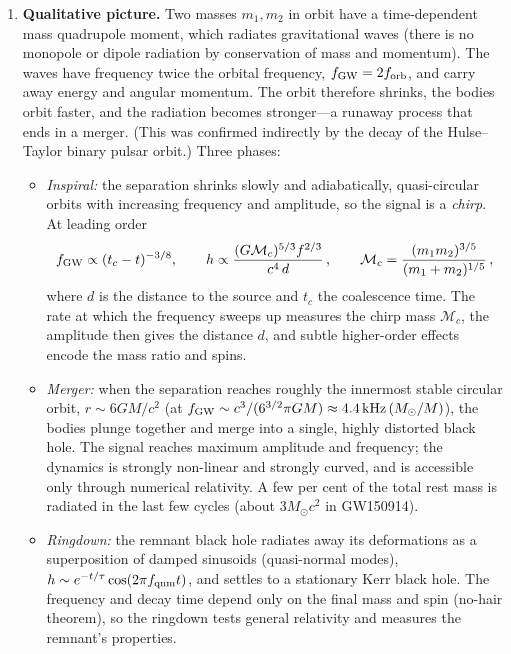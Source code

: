 \documentclass[12pt]{article}
\newcommand{\be}{\begin{equation}}
\newcommand{\ee}{\end{equation}}
\begin{document}
\begin{enumerate}[label=\alph*)]
\item \textbf{Qualitative picture.} Two masses $m_1,m_2$ in orbit have a time-dependent mass quadrupole moment, which radiates gravitational waves (there is no monopole or dipole radiation by conservation of mass and momentum). The waves have frequency twice the orbital frequency, $f_{\rm GW}=2f_{\rm orb}$, and carry away energy and angular momentum. The orbit therefore shrinks, the bodies orbit faster, and the radiation becomes stronger---a runaway process that ends in a merger. (This was confirmed indirectly by the decay of the Hulse--Taylor binary pulsar orbit.) Three phases:

\begin{itemize}
\item \emph{Inspiral:} the separation shrinks slowly and adiabatically, quasi-circular orbits with increasing frequency and amplitude, so the signal is a \emph{chirp}. At leading order
\be
f_{\rm GW}\propto(t_c-t)^{-3/8},\qquad h\propto\frac{(G\mathcal M_c)^{5/3}f^{2/3}}{c^4\,d}\,,\qquad \mathcal M_c=\frac{(m_1m_2)^{3/5}}{(m_1+m_2)^{1/5}}\,,
\ee
where $d$ is the distance to the source and $t_c$ the coalescence time. The rate at which the frequency sweeps up measures the chirp mass $\mathcal M_c$, the amplitude then gives the distance $d$, and subtle higher-order effects encode the mass ratio and spins.
\item \emph{Merger:} when the separation reaches roughly the innermost stable circular orbit, $r\sim6GM/c^2$ (at $f_{\rm GW}\sim c^3/(6^{3/2}\pi GM)\approx4.4\,{\rm kHz}\,(M_\odot/M)$), the bodies plunge together and merge into a single, highly distorted black hole. The signal reaches maximum amplitude and frequency; the dynamics is strongly non-linear and strongly curved, and is accessible only through numerical relativity. A few per cent of the total rest mass is radiated in the last few cycles (about $3M_\odot c^2$ in GW150914).
\item \emph{Ringdown:} the remnant black hole radiates away its deformations as a superposition of damped sinusoids (quasi-normal modes), $h\sim e^{-t/\tau}\cos(2\pi f_{\rm qnm}t)$, and settles to a stationary Kerr black hole. The frequency and decay time depend only on the final mass and spin (no-hair theorem), so the ringdown tests general relativity and measures the remnant's properties.
\end{itemize}


\end{enumerate}
\end{document}
